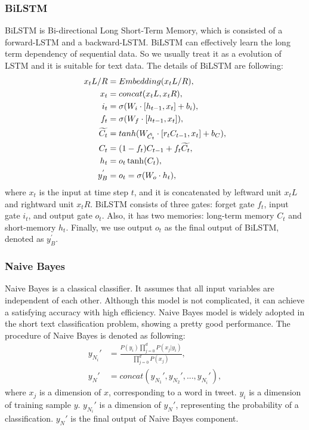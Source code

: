 \subsubsection{BiLSTM}
BiLSTM is Bi-directional Long Short-Term Memory, which is consisted of a forward-LSTM and a backward-LSTM. BiLSTM can effectively learn the long term dependency of sequential data. So we usually treat it as a evolution of LSTM and it is suitable for text data. The details of BiLSTM are following:
\begin{align}\label{eq:lstm}
x_tL/R &= Embedding(x_tL/R), \\
x_t &= concat(x_tL, x_tR), \\
i_t &= \sigma(W_i \cdot [h_{t-1}, x_t] + b_i),\\
f_t &= \sigma(W_f \cdot [h_{t-1}, x_t]),\\
\widetilde{C_t} &= tanh(W_{\tilde{C_t}} \cdot [r_t C_{t-1}, x_t]  + b_C),\\
C_t &= (1-f_t) C_{t-1} + f_t \widetilde{C_t},\\
h_t &=o_t \* \tanh(C_t),\\
y_B^{'} &= o_t =  \sigma(W_o \cdot h_t),
\end{align}
where $x_t$ is the input at time step $t$, and it is concatenated by leftward unit $x_tL$ and rightward unit $x_tR$. BiLSTM consists of three gates: forget gate $f_t$, input gate $i_t$, and output gate $o_t$. Also, it has two memories: long-term memory $C_t$ and short-memory $h_t$. Finally, we use output $o_t$ as the final output of BiLSTM, denoted as $y_B^{'}$.

\subsubsection{Naive Bayes}
Naive Bayes is a classical classifier. It assumes that all input variables are independent of each other. Although this model is not complicated, it can achieve a satisfying accuracy with high efficiency. Naive Bayes model is widely adopted in the short text classification problem, showing a pretty good performance. The procedure of Naive Bayes is denoted as following:
\begin{align}\label{eq:nb}
y_{N_{i}}' &= \frac{P(y_i)\prod_{j = 0}^d P(x_j|y_i)}{\prod_{j = 0}^d P(x_j)},\\
y_N' &= concat(y_{N_{1}}',y_{N_{2}}',..., y_{N_{i}}'),
\end{align}
where $x_j$ is a dimension of $x$, corresponding to a word in tweet.  $y_i$ is a dimension of training sample $y$. $y_{N_{i}}'$ is a dimension of $y_N'$, representing the probability of a classification. $y_N'$ is the final output of Naive Bayes component.
